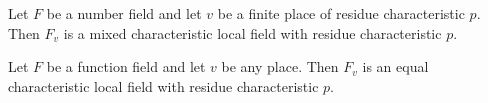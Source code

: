\begin{proposition}
\label{prop:number_field_localization}
Let $F$ be a number field and let $v$ be a finite place of residue characteristic $p$. Then $F_v$ is a mixed characteristic local field with residue characteristic $p$.
\end{proposition}

\begin{proposition}
\label{prop:function_field_localization}
Let $F$ be a function field and let $v$ be any place. Then $F_v$ is an equal characteristic local field with residue characteristic $p$.
\end{proposition}
